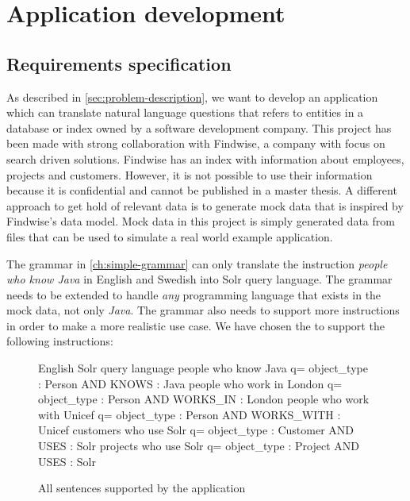 \chapter{Application development}\label{ch:application-overview}

\section{Requirements specification}

As described in \autoref{sec:problem-description}, we want to develop an application which can translate natural language questions that refers to entities in a database or index owned by a software development company. This project has been made with strong collaboration with Findwise, a company with focus on search driven solutions. Findwise has an index with information about employees, projects and customers. However, it is not possible to use their information because it is confidential and cannot be published in a master thesis. A different approach to get hold of relevant data is to generate mock data that is inspired by Findwise's data model. Mock data in this project is simply generated data from files that can be used to simulate a real world example application.

\label{sec:grammar-development}
The grammar in \autoref{ch:simple-grammar} can only translate the instruction \emph{people who know Java} in English and Swedish into Solr query language. The grammar needs to be extended to handle \emph{any} programming language that exists in the mock data, not only \emph{Java}. The grammar also needs to support more instructions in order to make a more realistic use case. We have chosen the to support the following instructions:

\begin{figure}[H]
\begin{terminal}
English                        Solr query language
people who know Java           q= object_type : Person AND KNOWS : Java
people who work in London      q= object_type : Person AND WORKS_IN : London
people who work with Unicef    q= object_type : Person AND WORKS_WITH : Unicef
customers who use Solr         q= object_type : Customer AND USES : Solr
projects who use Solr          q= object_type : Project AND USES : Solr
\end{terminal}
\caption{All sentences supported by the application}\label{fig:suppported-sentences}
\end{figure}

